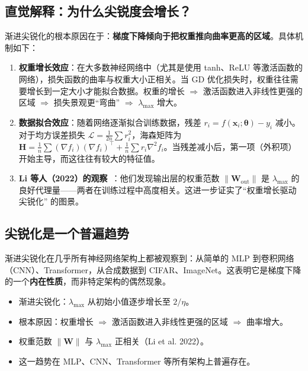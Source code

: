 \documentclass[11pt,a4paper]{ctexart}
\newcommand{\lmax}{\lambda_{\max}}
\newcommand{\Loss}{\mathcal{L}}
\newcommand{\Hmat}{\mathbf{H}}
\newcommand{\Wmat}{\mathbf{W}}
\begin{document}
\subsection{直觉解释：为什么尖锐度会增长？}

渐进尖锐化的根本原因在于：\textbf{梯度下降倾向于把权重推向曲率更高的区域}。具体机制如下：

\begin{enumerate}[leftmargin=2em]
  \item \textbf{权重增长效应}：在大多数神经网络中（尤其是使用 tanh、ReLU 等激活函数的网络），损失函数的曲率与权重大小正相关。当 GD 优化损失时，权重往往需要增长到一定大小才能拟合数据。权重的增长 $\Rightarrow$ 激活函数进入非线性更强的区域 $\Rightarrow$ 损失景观更``弯曲'' $\Rightarrow$ $\lmax$ 增大。

  \item \textbf{数据拟合效应}：随着网络逐渐拟合训练数据，残差 $r_i = f(\mathbf{x}_i;\boldsymbol{\theta}) - y_i$ 减小。对于均方误差损失 $\Loss = \frac{1}{2n}\sum r_i^2$，海森矩阵为 $\Hmat = \frac{1}{n}\sum (\nabla f_i)(\nabla f_i)^\top + \frac{1}{n}\sum r_i \nabla^2 f_i$。当残差减小后，第一项（外积项）开始主导，而这往往有较大的特征值。

  \item \textbf{Li 等人（2022）的观察}~\cite{li2022sharpness}：他们发现输出层的权重范数 $\|\Wmat_{\text{out}}\|$ 是 $\lmax$ 的良好代理量——两者在训练过程中高度相关。这进一步证实了``权重增长驱动尖锐化'' 的图景。
\end{enumerate}

\subsection{尖锐化是一个普遍趋势}

渐进尖锐化在几乎所有神经网络架构上都被观察到：从简单的 MLP 到卷积网络（CNN）、Transformer，从合成数据到 CIFAR、ImageNet。这表明它是梯度下降的一个\textbf{内在性质}，而非特定架构的偶然现象。


\begin{secnote}
\begin{itemize}[leftmargin=1.5em, itemsep=2pt]
  \item 渐进尖锐化：$\lmax$ 从初始小值逐步增长至 $2/\eta$。
  \item 根本原因：权重增长 $\Rightarrow$ 激活函数进入非线性更强的区域 $\Rightarrow$ 曲率增大。
  \item 权重范数 $\|\Wmat\|$ 与 $\lmax$ 正相关（Li et al. 2022）。
  \item 这一趋势在 MLP、CNN、Transformer 等所有架构上普遍存在。
\end{itemize}
\end{secnote}
\end{document}
